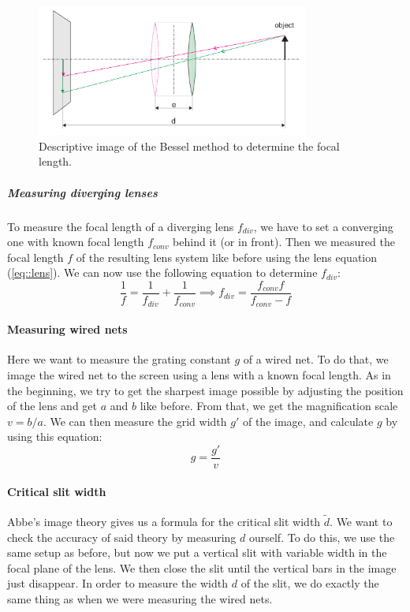 \begin{figure}[h!]
	\centering
	\includegraphics[width=0.8\textwidth]{img/bessel.PNG}
	\caption{Descriptive image\cite{manual} of the Bessel method to determine the focal length.}
	\label{fig::bessel}
\end{figure}


\subparagraph{Measuring diverging lenses}
\label{chap::div}
To measure the focal length of a diverging lens $f_{div}$, we have to set a converging one with known focal length $f_{conv}$ behind it (or in front). 
Then we measured the focal length $f$ of the resulting lens system like before using the lens equation (\ref{eq::lens}).
We can now use the following equation to determine $f_{div}$:
\begin{equation}
	\frac{1}{f} = \frac{1}{f_{div}} + \frac{1}{f_{conv}} \implies f_{div} = \frac{f_{conv} f}{f_{conv} - f}
	\label{eq::div}
\end{equation}


\paragraph{Measuring wired nets}
\label{chap::net}
Here we want to measure the grating constant $g$ of a wired net.
To do that, we image the wired net to the screen using a lens with a known focal length.
As in the beginning, we try to get the sharpest image possible by adjusting the position of the lens and get $a$ and $b$ like before.
From that, we get the magnification scale $v = b/a$.
We can then measure the grid width $g'$ of the image, and calculate $g$ by using this equation:
\begin{equation}
	g = \frac{g'}{v}
	\label{eq::grid}
\end{equation}

\paragraph{Critical slit width}
\label{chap::slit}
Abbe's image theory gives us a formula for the critical slit width $\tilde{d}$.
We want to check the accuracy of said theory by measuring $d$ ourself.
To do this, we use the same setup as before, but now we put a vertical slit with variable width in the focal plane of the lens. 
We then close the slit until the vertical bars in the image just disappear.
In order to measure the width $d$ of the slit, we do exactly the same thing as when we were measuring the wired nets. 
